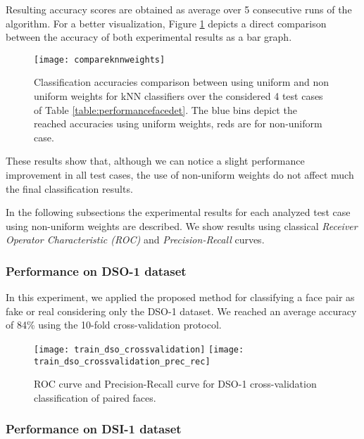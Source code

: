 Resulting accuracy scores are obtained as average over 5 consecutive runs of the algorithm. For a better visualization, Figure \ref{fig:compareknnweights} depicts a direct comparison between the accuracy of both experimental results as a bar graph.

\begin{figure}[h!]
  \centering
    \texttt{[image: compareknnweights]}
    \caption{Classification accuracies comparison between using uniform and non uniform weights for kNN classifiers over the considered 4 test cases of Table \ref{table:performancefacedet}. The blue bins depict the reached accuracies using uniform weights, reds are for non-uniform case.}
    \label{fig:compareknnweights}
\end{figure}

These results show that, although we can notice a slight performance improvement in all test cases, the use of non-uniform weights do not affect much the final classification results.

In the following subsections the experimental results for each analyzed test case using non-uniform weights are described. We show results using classical \emph{Receiver Operator Characteristic (ROC)} \cite{fawcett2006introduction} and \emph{Precision-Recall} curves\cite{Davis:2006:RPR:1143844.1143874}. 

\subsubsection{Performance on DSO-1 dataset}

In this experiment, we applied the proposed method for classifying a face pair as fake or real considering only the DSO-1 dataset. We reached an average accuracy of 84\% using the 10-fold cross-validation protocol.

\begin{figure}[!htb]
  \texttt{[image: train\_dso\_crossvalidation]}
\endminipage\hfill
{}
  \texttt{[image: train\_dso\_crossvalidation\_prec\_rec]}
\endminipage
\caption{ROC curve and Precision-Recall curve for DSO-1 cross-validation classification of paired faces.}\label{fig:regiondetnormal}
\end{figure}

\subsubsection{Performance on DSI-1 dataset}

